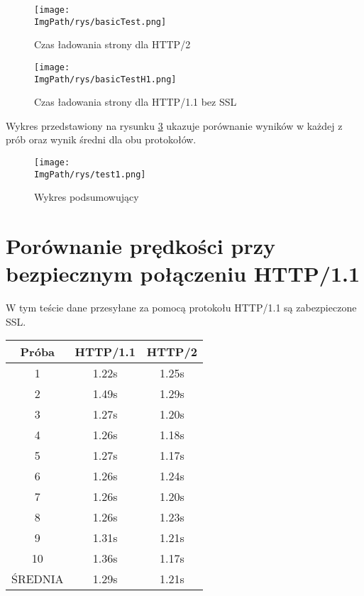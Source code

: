 \documentclass[a4paper,12pt,twoside,openany]{report}
\newcommand{\ImgPath}{.}
\begin{document}
\begin{figure}[!htbp]
	\begin{center}
\centering
\texttt{[image: \\ImgPath/rys/basicTest.png]}
\end{center}
	\caption{Czas ładowania strony dla HTTP/2}
	\label{schematBasicTest}
\end{figure}

\begin{figure}[!htbp]
	\begin{center}
\centering
\texttt{[image: \\ImgPath/rys/basicTestH1.png]}
\end{center}
	\caption{Czas ładowania strony dla HTTP/1.1 bez SSL}
	\label{schematBasicTestH1}
\end{figure}

Wykres przedstawiony na rysunku \ref{schematTest1} ukazuje porównanie wyników w każdej z prób oraz wynik średni dla obu protokołów.

\begin{figure}[!htbp]
	\begin{center}
\centering
\texttt{[image: \\ImgPath/rys/test1.png]}
\end{center}
	\caption{Wykres podsumowujący}
	\label{schematTest1}
\end{figure}

\section{Porównanie prędkości przy bezpiecznym połączeniu HTTP/1.1}

W tym teście dane przesyłane za pomocą protokołu HTTP/1.1 są zabezpieczone SSL.

\begin{tabular}{c|c|c}
Próba & HTTP/1.1 & HTTP/2 \\ \hline
1 & 1.22s & 1.25s \\
2 & 1.49s & 1.29s \\
3 & 1.27s & 1.20s \\
4 & 1.26s & 1.18s \\
5 & 1.27s & 1.17s \\
6 & 1.26s & 1.24s \\
7 & 1.26s & 1.20s \\
8 & 1.26s & 1.23s \\
9 & 1.31s & 1.21s \\
10 & 1.36s & 1.17s\\ \hline
ŚREDNIA & 1.29s & 1.21s \\
\end{tabular}
\end{document}
